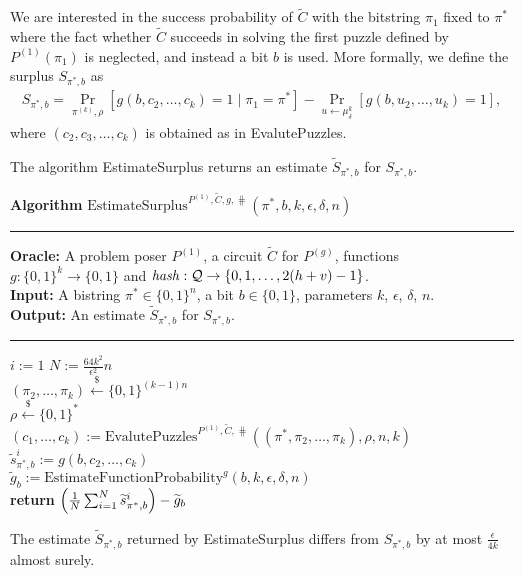 We are interested in the success probability of $\widetilde{C}$ with the bitstring $\pi_1$ fixed to $\pi^*$ where
the fact whether $\widetilde{C}$ succeeds in solving the first puzzle defined by $P^{(1)}(\pi_1)$ is neglected, and
instead a bit $b$ is used. More formally, we define the surplus $S_{\pi^*, b}$ as
\begin{align}
  \label{eq:s_pi_b}
S_{\pi^*, b} = \underset{\pi^{(k)}, \rho}{\Pr}\left[g(b, c_2, \dots, c_k) = 1 \mid \pi_1 = \pi^*\right] - \underset{u \leftarrow \mu^{k}_{\delta}}{\Pr}\left[g(b, u_2, \dots, u_k) = 1\right],
\end{align}
where $(c_2, c_3, \dotsc, c_k)$ is obtained as in EvalutePuzzles.

The algorithm EstimateSurplus returns an estimate $\widetilde{S}_{\pi^*, b}$ for $S_{\pi^*, b}$.
%
\begin{codeblock}
  \textbf{Algorithm} $\text{EstimateSurplus}^{P^{(1)}, \widetilde{C}, g, \hash}(\pi^*, b, k, \epsilon, \delta, n)$
  \medskip\hrule
  \textbf{Oracle:} A problem poser $P^{(1)}$, a circuit $\widetilde{C}$ for $P^{(g)}$, functions \\
  \IndII $g: \{0,1\}^{k} \rightarrow \{0,1\}$ and  $\operatorname{\mathit{hash}} : \mathcal{Q} \rightarrow \{0,1,\dots, 2(h+v)-1\}$.\\
  \textbf{Input:} A bistring $\pi^* \in \{0,1\}^{n}$, a bit $b \in \{0,1\}$, parameters $k$, $\epsilon$, $\delta$, $n$.\\
  \textbf{Output:} An estimate $\widetilde{S}_{\pi^*, b}$ for $S_{\pi^*, b}$.
  \medskip\hrule
  \For $i:=1$ \To $N := \frac{64k^2}{\epsilon^2}n$ \Do \\
  \IndI $(\pi_{2}, \dots, \pi_k) \xleftarrow{\$} \{0,1\}^{(k-1)n}$\\
  \IndI $\rho \xleftarrow{\$} \{0,1\}^{*}$\\
  \IndI $(c_1, \dots, c_k) := \text{EvalutePuzzles}^{P^{(1)}, \widetilde{C}, \hash}((\pi^*, \pi_2, \dots, \pi_k), \rho, n, k)$\\
  \IndI $\widetilde{s}_{\pi^*,b}^i := g(b, c_{2}, \dots, c_k)$\\
  $\widetilde{g}_b := \text{EstimateFunctionProbability}^{g}(b, k, \epsilon, \delta, n)$ \\
  \textbf{return} $\Bigl(\frac{1}{N} \sum_{i=1}^N \widetilde{s}_{\pi^*,b}^i \Bigr) - \widetilde{g}_b$
\end{codeblock}
%
\begin{lemma}
  \label{lemma:surplus_estimate}
The estimate $\widetilde{S}_{\pi^*,b}$ returned by EstimateSurplus differs from $S_{\pi^*, b}$ by at most $\frac{\epsilon}{4k}$ almost surely.
\end{lemma}

